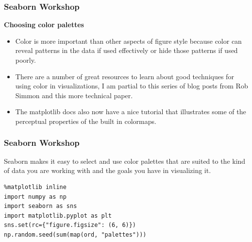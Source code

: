 \documentclass{beamer}
\begin{document}
\begin{frame}[fragile]
\frametitle{Seaborn Workshop}
\large

\noindent \textbf{Choosing color palettes}
\begin{itemize}
\item Color is more important than other aspects of figure style because color can reveal patterns in the data if used effectively or hide those patterns if used poorly. 
\item There are a number of great resources to learn about good techniques for using color in visualizations, I am partial to this series of blog posts from Rob Simmon and this more technical paper. 
\item The matplotlib docs also now have a nice tutorial that illustrates some of the perceptual properties of the built in colormaps.
\end{itemize}

\end{frame}
\begin{frame}[fragile]
\frametitle{Seaborn Workshop}
\large
Seaborn makes it easy to select and use color palettes that are suited to the kind of data you are working with and the goals you have in visualizing it.
\begin{framed}
\begin{verbatim}
%matplotlib inline
import numpy as np
import seaborn as sns
import matplotlib.pyplot as plt
sns.set(rc={"figure.figsize": (6, 6)})
np.random.seed(sum(map(ord, "palettes")))
\end{verbatim}
\end{framed}

\end{frame}
\end{document}
